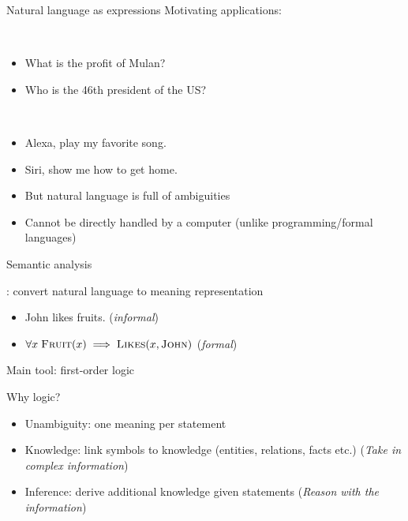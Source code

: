 \documentclass[usenames,dvipsnames,notes,11pt,aspectratio=169]{beamer}
\begin{document}
\begin{frame}
    {Natural language as expressions}
    Motivating applications:

    \\
    \begin{itemize}
        \item[] What is the profit of Mulan? 
        \item[] Who is the 46th president of the US?
    \end{itemize}

    \\
    \begin{itemize}
        \item[] Alexa, play my favorite song.
        \item[] Siri, show me how to get home.
    \end{itemize}

    \begin{itemize}
        \item But natural language is full of ambiguities
        \item Cannot be directly handled by a computer (unlike programming/formal languages)
    \end{itemize}
\end{frame}

\begin{frame}
    {Semantic analysis}

    : convert natural language to meaning representation\\
    \begin{itemize}
        \item[] John likes fruits. (\emph{informal}) 
        \item[] $\forall x \; \textsc{Fruit}(x) \implies \textsc{Likes}(x, \textsc{John})$ (\emph{formal})
    \end{itemize}

    {Main tool}: first-order logic 

    Why logic?\\
    \begin{itemize}
        \item Unambiguity: one meaning per statement
        \item Knowledge: link symbols to knowledge (entities, relations, facts etc.) (\emph{Take in complex information})
        \item Inference: derive additional knowledge given statements  (\emph{Reason with the information})
    \end{itemize}
\end{frame}
\end{document}
